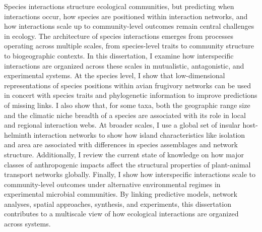 Species interactions structure ecological communities, but predicting when interactions occur, how species are positioned within interaction networks, and how interactions scale up to community-level outcomes remain central challenges in ecology. The architecture of species interactions emerges from processes operating across multiple scales, from species-level traits to community structure to biogeographic contexts. In this dissertation, I examine how interspecific interactions are organized across these scales in mutualistic, antagonistic, and experimental systems. At the species level, I show that low-dimensional representations of species positions within avian frugivory networks can be used in concert with species traits and phylogenetic information to improve predictions of missing links. I also show that, for some taxa, both the geographic range size and the climatic niche breadth of a species are associated with its role in local and regional interaction webs. At broader scales, I use a global set of insular host-helminth interaction networks to show how island characteristics like isolation and area are associated with differences in species assemblages and network structure. Additionally, I review the current state of knowledge on how major classes of anthropogenic impacts affect the structural properties of plant-animal transport networks globally. Finally, I show how interspecific interactions scale to community-level outcomes under alternative environmental regimes in experimental microbial communities. By linking predictive models, network analyses, spatial approaches, synthesis, and experiments, this dissertation contributes to a multiscale view of how ecological interactions are organized across systems.
